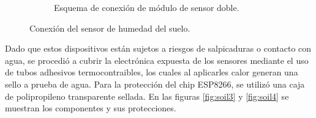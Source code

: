 \begin{figure}[!h]
\begin{subfigure}[b]{0.45\textwidth}
		\caption[Esquema de conexión de módulo de sensor doble]{Esquema de conexión de módulo de sensor doble.}
		\label{fig:soilschem2}
     \end{subfigure}
     \hfill
        \caption[Conexión del sensor de humedad del suelo]{Conexión del sensor de humedad del suelo.}	\label{fig:soilschem}
\end{figure}

Dado que estos dispositivos están sujetos a riesgos de salpicaduras o contacto con agua, se procedió a cubrir la electrónica expuesta de los sensores mediante el uso de tubos adhesivos termocontraibles, los cuales al aplicarles calor generan una sello a prueba de agua. Para la protección del chip ESP8266, se utilizó una caja de polipropileno transparente sellada. En las figuras \ref{fig:soil3} y \ref{fig:soil4} se muestran los componentes y sus protecciones. 

